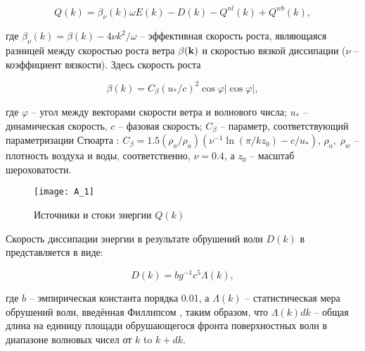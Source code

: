 \begin{equation} \label{1.31)} Q(k)=\beta _{\nu } (k)\omega E(k)-D(k)-Q^{nl} (k)+Q^{wb} (k), \end{equation} 



\noindent где $\beta _{\nu } (k)=\beta (k)-4\nu k^{2} /\omega $ -- эффективная скорость роста, являющаяся разницей между скоростью роста ветра $\beta ({\bf k})$ и скоростью вязкой диссипации ($\nu $ -- коэффициент вязкости). Здесь скорость роста



\begin{equation} \label{1.32)} \beta (k)=C_{\beta } (u_{*} /c)^{2} \cos \varphi |\cos \varphi |, \end{equation} 



\noindent где $\varphi $ -- угол между векторами скорости ветра и волнового числа; $u_{*} $ -- динамическая скорость, $c$ -- фазовая скорость; $C_{\beta } $ -- параметр, соответствующий параметризации Стюарта \citep{Stewart1974}: $C_{\beta } =1.5(\rho _{a} /\rho _{a} )(\nu ^{-1} \ln (\pi /kz_{0} )-c/u_{*} )$, $\rho _{a} ,\; \rho _{w} $ -- плотность воздуха и воды, соответственно, $\nu =0.4$, а $z_{0} $ -- масштаб шероховатости. 



\begin{figure}[H]
    \texttt{[image: A\_1]}
    \caption{Источники и стоки энергии $Q(k)$}
    \label{fig:A.1}
\end{figure}


Скорость диссипации энергии в результате обрушений волн $D(k)$ в  \citep{Phillips1985} представляется в виде:



\begin{equation} \label{1.33)} D(k)=bg^{-1} c^{5} \Lambda (k), \end{equation} 



\noindent где $b$ -- эмпирическая константа порядка 0.01, а $\Lambda (k)$ -- статистическая мера обрушений волн, введённая Филлипсом \citep{Phillips1985}, таким образом, что $\Lambda (k)dk$ -- общая длина на единицу площади обрушающегося фронта поверхностных волн в диапазоне волновых чисел от $k$ to $k+dk$.

